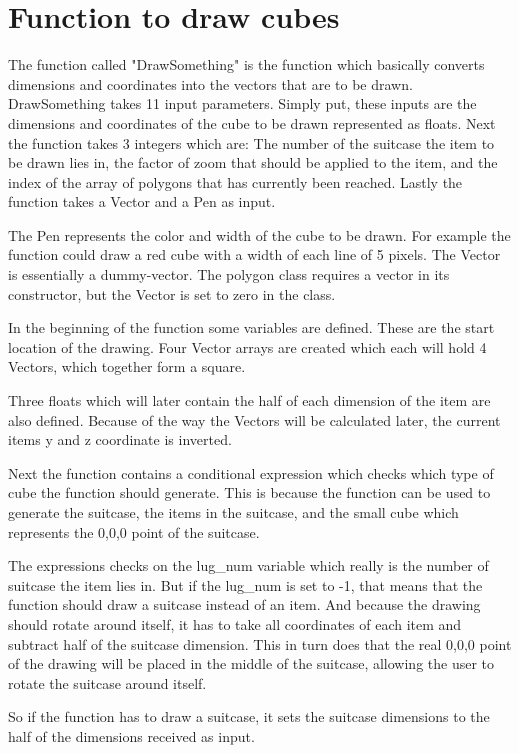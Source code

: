 \section{Function to draw cubes}
The function called "DrawSomething" is the function which basically converts dimensions and coordinates into the vectors that are to be drawn.
DrawSomething takes 11 input parameters. Simply put, these inputs are the dimensions and coordinates of the cube to be drawn represented as floats. Next the function takes 3 integers which are: The number of the suitcase the item to be drawn lies in, the factor of zoom that should be applied to the item, and the index of the array of polygons that has currently been reached. Lastly the function takes a Vector and a Pen as input.

The Pen represents the color and width of the cube to be drawn. For example the function could draw a red cube with a width of each line of 5 pixels. The Vector is essentially a dummy-vector. The polygon class requires a vector in its constructor, but the Vector is set to zero in the class.

In the beginning of the function some variables are defined. These are the start location of the drawing. Four Vector arrays are created which each will hold 4 Vectors, which together form a square.

Three floats which will later contain the half of each dimension of the item are also defined.
Because of the way the Vectors will be calculated later, the current items y and z coordinate is inverted. 

Next the function contains a conditional expression which checks which type of cube the function should generate. This is because the function can be used to generate the suitcase, the items in the suitcase, and the small cube which represents the 0,0,0 point of the suitcase. 

The expressions checks on the lug\_num variable which really is the number of suitcase the item lies in. But if the lug\_num is set to -1, that means that the function should draw a suitcase instead of an item. And because the drawing should rotate around itself, it has to take all coordinates of each item and subtract half of the suitcase dimension. This in turn does that the real 0,0,0 point of the drawing will be placed in the middle of the suitcase, allowing the user to rotate the suitcase around itself.

So if the function has to draw a suitcase, it sets the suitcase dimensions to the half of the dimensions received as input.

